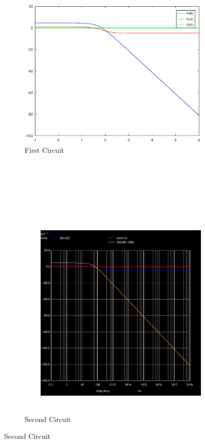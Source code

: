 \begin{figure}[h] \centering

\begin{subfigure}{0.4\textwidth}
\includegraphics[width=\textwidth]{Amplitude.eps}
\caption{First Circuit}
\label{fig:first}
\end{subfigure}
\begin{subfigure}{0.4\textwidth}
\includegraphics[width=\textwidth]{sim5_db.pdf}
\caption{Second Circuit}
\label{fig:second}
\end{subfigure}

\end{figure}



